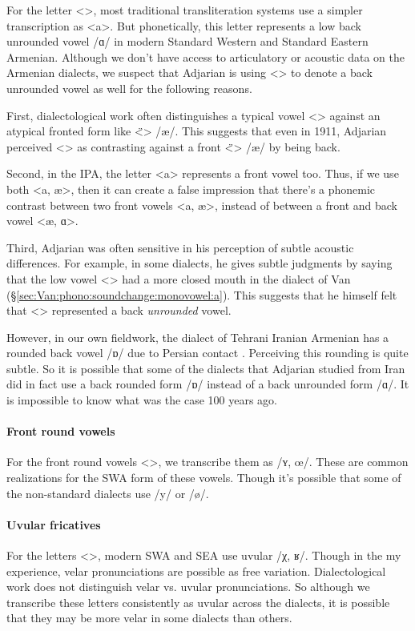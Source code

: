 For the letter <>, most traditional transliteration systems use a simpler transcription as <a>. But phonetically, this letter represents a low back unrounded vowel /ɑ/ in modern Standard Western and Standard Eastern Armenian. Although we don't have access to articulatory or acoustic data on the Armenian dialects, we suspect that Adjarian is using <> to denote a back unrounded vowel as well for the following reasons. 


First, dialectological work often distinguishes a typical vowel <> against an atypical fronted form like <̈> /æ/. This suggests that even in 1911, Adjarian perceived <> as contrasting against a front <̈> /æ/ by being back. 

Second, in the IPA, the letter <a> represents a front vowel too. Thus, if we use both <a, æ>, then it can create a false impression that there's a phonemic contrast between two front vowels <a, æ>, instead of between a front and back vowel <æ, ɑ>. 

Third, Adjarian was often sensitive in his perception of subtle acoustic differences. For example, in some dialects, he gives subtle judgments by saying that the low vowel <> had a more closed mouth in the dialect of Van (\S\ref{sec:Van:phono:soundchange:monovowel:a}). This suggests that he himself felt that <> represented a back \textit{unrounded} vowel. 

However, in our own fieldwork, the dialect of Tehrani Iranian Armenian has a rounded back vowel /ɒ/ due to Persian contact \citep{DolatianEtAl-prep-IranianGrammar}. Perceiving this rounding is quite subtle. So it is possible that some of the dialects that Adjarian studied from Iran did in fact use a back rounded form /ɒ/ instead of a back unrounded form /ɑ/. It is impossible to know what was the case 100 years ago.
\paragraph{Front round vowels}
For the front round vowels <>, we transcribe them as /ʏ, œ/. These are common realizations for the SWA form of these vowels. Though it's possible that some of the non-standard dialects use /y/ or /ø/. 

\paragraph{Uvular fricatives}
For the letters <>, modern SWA and SEA use uvular /χ, ʁ/. Though in the my experience, velar pronunciations are possible as free variation. Dialectological work does not distinguish velar vs. uvular pronunciations. So although we transcribe these letters consistently as uvular across the dialects, it is possible that they may be more velar in some dialects than others. 

